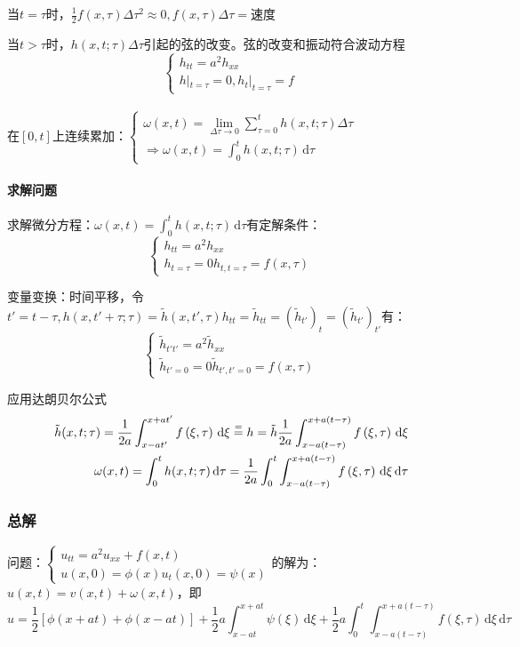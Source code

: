 当\(t=\tau\)时，\(\frac{1}{2}f(x,\tau)\Delta\tau^2\approx0,f(x,\tau)\Delta\tau=\)速度

当\(t>\tau\)时，\(h(x,t;\tau)\Delta\tau\)引起的弦的改变。弦的改变和振动符合波动方程\[\begin{cases}h_{tt}=a^2h_{xx}\\h|_{t=\tau}=0,h_t|_{t=\tau}=f\end{cases}\]\\
在\([0,t]\)上连续累加：\(\begin{cases}\omega(x,t)=\lim\limits_{\Delta\tau\rightarrow0}{\sum\limits_{\tau=0}^{t}h(x,t;\tau)\Delta\tau}\\\Rightarrow\omega(x,t)=\int_{0}^{t}h(x,t;\tau)\,\mathrm{d}\tau\end{cases}\)

\paragraph{求解问题}求解微分方程：\(\omega(x,t)=\int_{0}^{t}h(x,t;\tau)\,\mathrm{d}\tau\)有定解条件：\[\begin{cases}h_{tt}=a^2h_{xx}\\h_{t=\tau}=0h_{t,t=\tau}=f(x,\tau)\end{cases}\]

变量变换：时间平移，令\(t'=t-\tau,h(x,t'+\tau;\tau)=\tilde{h}(x,t',\tau) h_{tt}={\tilde{h}}_{tt}=\left({\tilde{h}}_{t'}\right)_t=\left({\tilde{h}}_{t'}\right)_{t'}\)有：
\[\begin{cases}{\tilde{h}}_{t' t'}=a^2{\tilde{h}}_{xx}\\{\tilde{h}}_{t'=0}=0{\tilde{h}}_{t',t'=0}=f(x,\tau)\end{cases}\]

应用达朗贝尔公式
\begin{align*}
\tilde{h}(x,t;\tau)=\frac{1}{2a}\int_{x-at'}^{x+at'}f\left(\xi,\tau\right)\,\mathrm{d}\xi\buildrel=\over=h=\tilde{h}\frac{1}{2a}\int_{x-a(t-\tau)}^{x+a(t-\tau)}f\left(\xi,\tau\right)\,\mathrm{d}\xi\\
\omega(x,t)=\int_{0}^{t}h(x,t;\tau)\,\mathrm{d}\tau=\frac{1}{2a}\int_{0}^{t}{\int_{x-a(t-\tau)}^{x+a(t-\tau)}f\left(\xi,\tau\right)\,\mathrm{d}\xi \,\mathrm{d}\tau}
\end{align*}

\subsubsection{总解}

问题：\(\begin{cases}u_{tt}=a^2u_{xx}+f(x,t)\\u(x,0)=\phi(x)u_t(x,0)=\psi(x)\end{cases}\)的解为：\(u(x,t)=v(x,t)+\omega(x,t)\)，即
\[
u=\frac{1}{2}[\phi(x+at)+\phi(x-at)]+\frac{1}{2}a\int_{x-at}^{x+at}{\psi(\xi)\,\mathrm{d}\xi}+\frac{1}{2}a\int_{0}^{t}{\int_{x-a(t-\tau)}^{x+a(t-\tau)}f\left(\xi,\tau\right)\,\mathrm{d}\xi \,\mathrm{d}\tau}
\]

